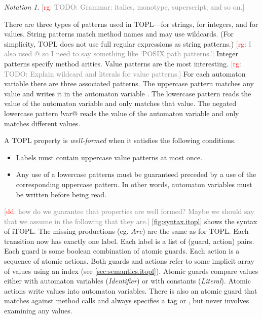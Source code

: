 \documentclass[preprint]{sigplanconf} %
\newcommand{\note}[2]{\textcolor{gray}{[\textcolor{red}{#1}: #2]}}
\newcommand{\rg}[1]{\note{rg}{#1}}
\newcommand{\dd}[1]{\note{dd}{#1}}
\newcommand{\dinocomment}[1]{\dd{#1}}
\theoremstyle{definition}
\theoremstyle{remark}
\newtheorem{notation}{Notation}
\begin{document}
\begin{notation}
\rg{TODO: Grammar: italics, monotype, superscript, and so on.}
\end{notation}

There are three types of patterns used in TOPL---for strings, for integers, and for values.
String patterns match method names and may use wildcards.
(For simplicity, TOPL does not use full regular expressions as string patterns.)
\rg{I also used @ so I need to say something like `POSIX path patterns.'}
Integer patterns specify method arities.
Value patterns are the most interesting.
\rg{TODO: Explain wildcard and literals for value patterns.}
For each automaton variable \Verb@var@ there are three associated patterns.
The uppercase pattern \Verb@Var@ matches any value and writes it in the automaton variable \Verb@var@.
The lowercase pattern \Verb@var@ reads the value of the automaton variable \Verb@var@ and only matches that value.
The negated lowercase pattern \Verb@!var@ reads the value of the automaton variable \Verb@var@ and only matches different values.

A TOPL property is \emph{well-formed} when it satisfies the following conditions.
\begin{itemize}
\item Labels must contain uppercase value patterns at most once.
\item Any use of a lowercase patterns must be guaranteed preceded by a
  use of the corresponding uppercase pattern.
  In other words, automaton variables must be written before being read.
\end{itemize}
\dinocomment{how do we guarantee that properties are well formed? Maybe we should say that we assume in the following that they are.}
\autoref{fig:syntax.itopl} shows the syntax of iTOPL\null.
The missing productions (eg. $Arc$) are the same as for TOPL\null.
Each transition now has exactly one label.
Each label is a list of (guard, action) pairs.
Each guard is some boolean combination of atomic guards.
Each action is a sequence of atomic actions.
Both guards and actions refer to some implicit array of values using an index (see \autoref{sec:semantics.itopl}).
Atomic guards compare values either with automaton variables (\textit{Identifier}) or with constants (\textit{Literal}).
Atomic actions write values into automaton variables.
There is also an atomic guard that matches against method calls and always specifies a tag \Verb@call@ or \Verb@return@, but never involves examining any values.
\end{document}
